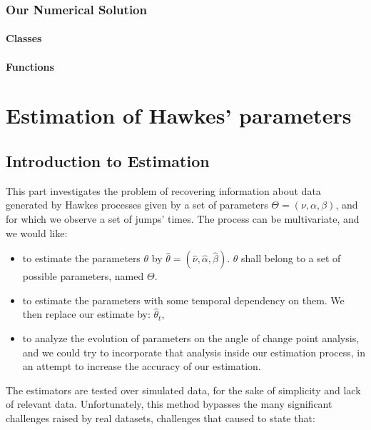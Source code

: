\documentclass[11pt]{book}
\begin{document}
\section{Our Numerical Solution}
\subsection{Classes}
\subsection{Functions}












\part{Estimation of Hawkes' parameters}
\chapter{Introduction to Estimation}

This part investigates the problem of recovering information about data generated by Hawkes processes given by a set of parameters $\Theta = ( \nu, \alpha, \beta ) $, and for which we observe a set of jumps' times. The process can be multivariate, and we would like:

\begin{itemize}
\item to estimate the parameters $\theta$ by $\hat{\theta} = ( \hat{\nu}, \hat{\alpha}, \hat{\beta} )$. $\theta$ shall belong to a set of possible parameters, named $\Theta$.

\item to estimate the parameters with some temporal dependency on them. We then replace our estimate by: $\hat{\theta}_t$,
\item to analyze the evolution of parameters on the angle of change point analysis, and we could try to incorporate that analysis inside our estimation process, in an attempt to increase the accuracy of our estimation.
\end{itemize}


The estimators are tested over simulated data, for the sake of simplicity and lack of relevant data. Unfortunately, this method bypasses the many significant challenges raised by real datasets, challenges that caused \cite{critic_hawkes} to state that:
\end{document}
